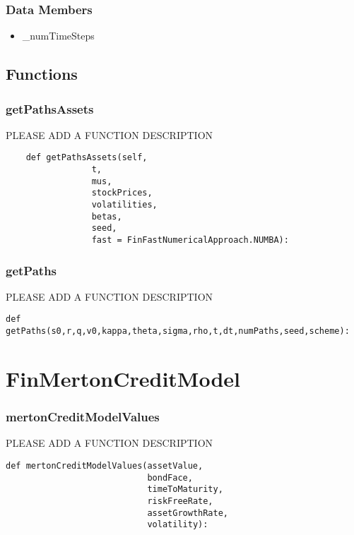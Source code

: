 \documentclass[twoside,11pt]{book}
\begin{document}
\subsubsection*{Data Members}
\begin{itemize}
\item{\_numTimeSteps}
\end{itemize}

\subsection*{Functions}

\subsubsection*{{\bf getPathsAssets}}
PLEASE ADD A FUNCTION DESCRIPTION

\begin{lstlisting}
    def getPathsAssets(self, 
                 t,
                 mus,
                 stockPrices,
                 volatilities,
                 betas,
                 seed, 
                 fast = FinFastNumericalApproach.NUMBA):
\end{lstlisting}

\subsubsection*{{\bf getPaths}}
PLEASE ADD A FUNCTION DESCRIPTION

\begin{lstlisting}
def getPaths(s0,r,q,v0,kappa,theta,sigma,rho,t,dt,numPaths,seed,scheme):
\end{lstlisting}

\newpage
\section{FinMertonCreditModel}

\subsubsection*{{\bf mertonCreditModelValues}}
PLEASE ADD A FUNCTION DESCRIPTION

\begin{lstlisting}
def mertonCreditModelValues(assetValue,
                            bondFace,
                            timeToMaturity,
                            riskFreeRate,
                            assetGrowthRate,
                            volatility):
\end{lstlisting}
\end{document}
